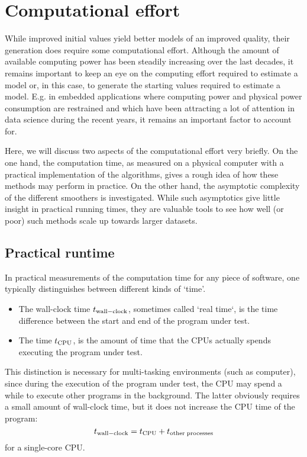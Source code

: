 \section{Computational effort}\label{sec:initvals:computation}
While improved initial values yield better models of an improved quality, their generation does require some computational effort.
Although the amount of available computing power has been steadily increasing over the last decades, it remains important to keep an eye on the computing effort required to estimate a model or, in this case, to generate the starting values required to estimate a model.
E.g. in embedded applications where computing power and physical power consumption are  restrained and which have been attracting a lot of attention in data science during the recent years, it remains an important factor to account for.

Here, we will discuss two aspects of the computational effort very briefly.
On the one hand, the computation time, as measured on a physical computer with a practical implementation of the algorithms, gives a rough idea of how these methods may perform in practice.
On the other hand, the asymptotic complexity of the different smoothers is investigated. 
While such asymptotics give little insight in practical running times, they are valuable tools to see how well (or poor) such methods scale up towards larger datasets.

\subsection{Practical runtime}
In practical measurements of the computation time for any piece of software, one typically distinguishes between different kinds of `time'.
\begin{itemize}
  \item The wall-clock time $t_{\mathrm{wall-clock}}$, sometimes called `real time`, is the time difference between the start and end of the program under test.
  \item The  time $t_{\mathrm{CPU}}$, is the amount of time that the \glspl{CPU} actually spends executing the program under test.
\end{itemize}
This distinction is necessary for multi-tasking environments (such as computer), since during the execution of the program under test, the \gls{CPU} may spend a while to execute other programs in the background.
The latter obviously requires a small amount of wall-clock time, but it does not increase the \gls{CPU} time of the program:
\begin{equation}
  t_{\mathrm{wall-clock}} = t_{\mathrm{CPU}} + t_{\mathrm{other\;processes}}
\end{equation}
for a single-core \gls{CPU}.

